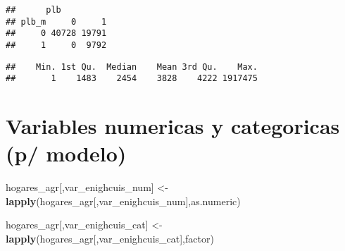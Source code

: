 \documentclass[11pt,]{article}
\newenvironment{Shaded}{\begin{snugshade}}{\end{snugshade}}
\newcommand{\KeywordTok}[1]{\textcolor[rgb]{0.13,0.29,0.53}{\textbf{#1}}}
\newcommand{\DataTypeTok}[1]{\textcolor[rgb]{0.13,0.29,0.53}{#1}}
\newcommand{\DecValTok}[1]{\textcolor[rgb]{0.00,0.00,0.81}{#1}}
\newcommand{\StringTok}[1]{\textcolor[rgb]{0.31,0.60,0.02}{#1}}
\newcommand{\OtherTok}[1]{\textcolor[rgb]{0.56,0.35,0.01}{#1}}
\newcommand{\OperatorTok}[1]{\textcolor[rgb]{0.81,0.36,0.00}{\textbf{#1}}}
\newcommand{\NormalTok}[1]{#1}
\begin{document}
\begin{verbatim}
##      plb
## plb_m     0     1
##     0 40728 19791
##     1     0  9792
\end{verbatim}

\begin{Shaded}
\end{Shaded}

\begin{verbatim}
##    Min. 1st Qu.  Median    Mean 3rd Qu.    Max. 
##       1    1483    2454    3828    4222 1917475
\end{verbatim}

\section{Variables numericas y categoricas (p/
modelo)}\label{variables-numericas-y-categoricas-p-modelo}

\begin{Shaded}
\begin{Highlighting}[]
\NormalTok{hogares_agr[,var_enighcuis_num] <-}\StringTok{ }\KeywordTok{lapply}\NormalTok{(hogares_agr[,var_enighcuis_num],as.numeric)}

\NormalTok{hogares_agr[,var_enighcuis_cat] <-}\StringTok{ }\KeywordTok{lapply}\NormalTok{(hogares_agr[,var_enighcuis_cat],factor)}
\end{Highlighting}
\end{Shaded}
\end{document}

